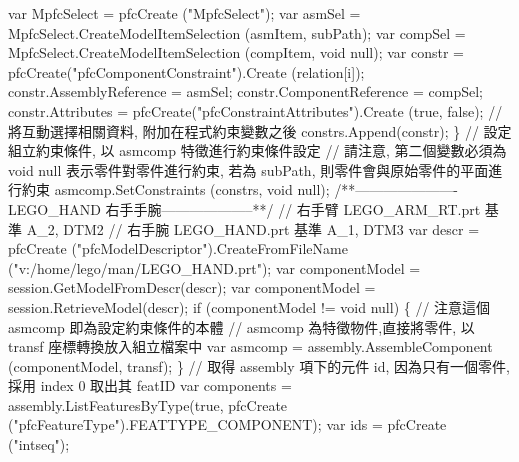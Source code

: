 \documentclass[]{article}
\newenvironment{Shaded}{}{}
\newcommand{\StringTok}[1]{\textcolor[rgb]{0.25,0.44,0.63}{{#1}}}
\begin{document}
\begin{Shaded}
\begin{Highlighting}[]
\StringTok{    var MpfcSelect = pfcCreate ("MpfcSelect");}
\StringTok{    var asmSel = MpfcSelect.CreateModelItemSelection (asmItem, subPath);}
\StringTok{    var compSel = MpfcSelect.CreateModelItemSelection (compItem, void null);}
\StringTok{    var constr = pfcCreate("pfcComponentConstraint").Create (relation[i]);}
\StringTok{    constr.AssemblyReference  = asmSel;}
\StringTok{    constr.ComponentReference = compSel;}
\StringTok{    constr.Attributes = pfcCreate("pfcConstraintAttributes").Create (true, false);}
\StringTok{                  // 將互動選擇相關資料, 附加在程式約束變數之後}
\StringTok{    constrs.Append(constr);}
\StringTok{\}}
\StringTok{// 設定組立約束條件, 以 asmcomp 特徵進行約束條件設定}
\StringTok{// 請注意, 第二個變數必須為 void null 表示零件對零件進行約束, 若為 subPath, 則零件會與原始零件的平面進行約束}
\StringTok{asmcomp.SetConstraints (constrs, void null);}
\StringTok{/**---------------------- LEGO_HAND 右手手腕--------------------**/}
\StringTok{// 右手臂 LEGO_ARM_RT.prt 基準  A_2, DTM2}
\StringTok{// 右手腕 LEGO_HAND.prt 基準 A_1, DTM3}
\StringTok{var descr = pfcCreate ("pfcModelDescriptor").CreateFromFileName ("v:/home/lego/man/LEGO_HAND.prt");}
\StringTok{var componentModel = session.GetModelFromDescr(descr);}
\StringTok{var componentModel = session.RetrieveModel(descr);}
\StringTok{if (componentModel != void null)}
\StringTok{\{}
\StringTok{        // 注意這個 asmcomp 即為設定約束條件的本體}
\StringTok{        // asmcomp 為特徵物件,直接將零件, 以 transf 座標轉換放入組立檔案中}
\StringTok{var asmcomp = assembly.AssembleComponent (componentModel, transf);}
\StringTok{\}}
\StringTok{// 取得 assembly 項下的元件 id, 因為只有一個零件, 採用 index 0 取出其 featID}
\StringTok{var components = assembly.ListFeaturesByType(true, pfcCreate ("pfcFeatureType").FEATTYPE_COMPONENT);}
\StringTok{var ids = pfcCreate ("intseq");}


\end{Highlighting}
\end{Shaded}
\end{document}
